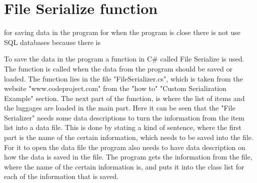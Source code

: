 \section{File Serialize function}
for saving data in the program for when the program is close there is not use SQL databases because there is 



To save the data in the program a function in C\# called File Serialize is used. The function is called when the data from the program should be saved or loaded. The function lies in the file "FileSerializer.cs", which is taken from the website "www.codeproject.com" from the "how to" "Custom Serialization Example" section. The next part of the function, is where the list of items and the luggages are loaded in the main part. 
Here it can be seen that the "File Serializer" needs some data descriptions to turn the information from the item list into a data file. 
This is done by stating a kind of sentence, where the first part is the name of the certain information, which needs to be saved into the file. 
For it to open the data file the program also needs to have data description on how the data is saved in the file. The program gets the information from the file, where the name of the certain information is, and puts it into the class list for each of the information that is saved.